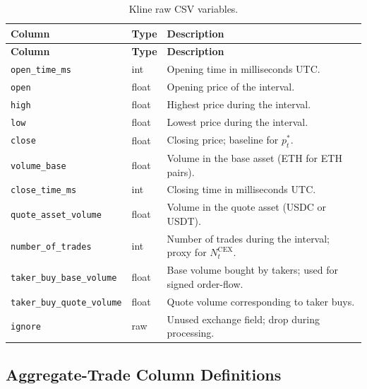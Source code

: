 \documentclass[11pt,a4paper]{article}
\begin{document}
\begin{longtable}{L{4.2cm}L{2.4cm}L{8.0cm}}
\caption{Kline raw CSV variables.}\\
\toprule
\textbf{Column} & \textbf{Type} & \textbf{Description} \\
\midrule
\endfirsthead
\toprule
\textbf{Column} & \textbf{Type} & \textbf{Description} \\
\midrule
\endhead
\bottomrule
\endfoot
\texttt{open\_time\_ms} & int & Opening time in milliseconds UTC. \\
\texttt{open} & float & Opening price of the interval. \\
\texttt{high} & float & Highest price during the interval. \\
\texttt{low} & float & Lowest price during the interval. \\
\texttt{close} & float & Closing price; baseline for $p^*_t$. \\
\texttt{volume\_base} & float & Volume in the base asset (ETH for ETH pairs). \\
\texttt{close\_time\_ms} & int & Closing time in milliseconds UTC. \\
\texttt{quote\_asset\_volume} & float & Volume in the quote asset (USDC or USDT). \\
\texttt{number\_of\_trades} & int & Number of trades during the interval; proxy for $N^{\mathrm{CEX}}_t$. \\
\texttt{taker\_buy\_base\_volume} & float & Base volume bought by takers; used for signed order-flow. \\
\texttt{taker\_buy\_quote\_volume} & float & Quote volume corresponding to taker buys. \\
\texttt{ignore} & raw & Unused exchange field; drop during processing. \\
\end{longtable}

\subsection{Aggregate-Trade Column Definitions}
\end{document}
